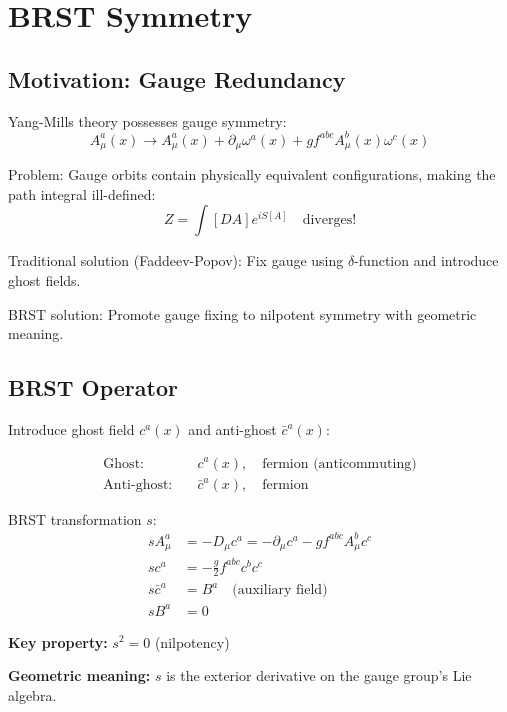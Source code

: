 \section{BRST Symmetry}

\subsection{Motivation: Gauge Redundancy}

Yang-Mills theory possesses gauge symmetry:
\begin{equation}
A_\mu^a(x) \to A_\mu^a(x) + \partial_\mu \omega^a(x) + g f^{abc} A_\mu^b(x) \omega^c(x)
\end{equation}

Problem: Gauge orbits contain physically equivalent configurations, making the path integral ill-defined:
\begin{equation}
Z = \int [DA] e^{iS[A]} \quad \text{diverges!}
\end{equation}

Traditional solution (Faddeev-Popov): Fix gauge using $\delta$-function and introduce ghost fields.

BRST solution: Promote gauge fixing to nilpotent symmetry with geometric meaning.

\subsection{BRST Operator}

Introduce ghost field $c^a(x)$ and anti-ghost $\bar{c}^a(x)$:

\begin{align}
\text{Ghost:} \quad & c^a(x), \quad \text{fermion (anticommuting)} \\
\text{Anti-ghost:} \quad & \bar{c}^a(x), \quad \text{fermion}
\end{align}

BRST transformation $s$:
\begin{align}
s A_\mu^a &= -D_\mu c^a = -\partial_\mu c^a - g f^{abc} A_\mu^b c^c \\
s c^a &= -\frac{g}{2} f^{abc} c^b c^c \\
s \bar{c}^a &= B^a \quad \text{(auxiliary field)} \\
s B^a &= 0
\end{align}

\textbf{Key property:} $s^2 = 0$ (nilpotency)

\textbf{Geometric meaning:} $s$ is the exterior derivative on the gauge group's Lie algebra.

